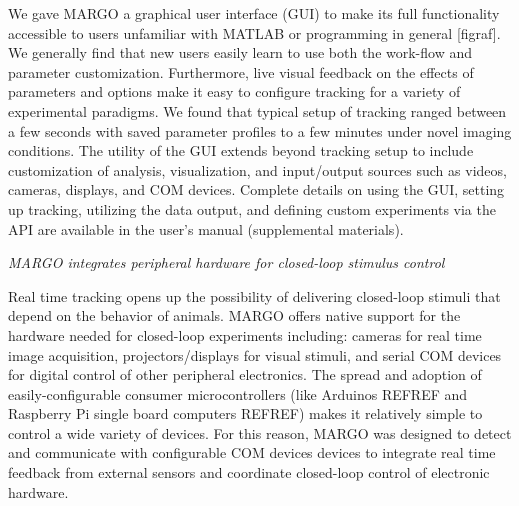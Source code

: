 \documentclass[10pt]{article}
\begin{document}
\begin{multicols}{2}
We gave MARGO a graphical user interface (GUI) to make its full functionality accessible to users unfamiliar with MATLAB or programming in general [figraf]. We generally find that new users easily learn to use both the work-flow and parameter customization. Furthermore, live visual feedback on the effects of parameters and options make it easy to configure tracking for a variety of experimental paradigms. We found that typical setup of tracking ranged between a few seconds with saved parameter profiles to a few minutes under novel imaging conditions. The utility of the GUI extends beyond tracking setup to include customization of analysis, visualization, and input/output sources such as videos, cameras, displays, and COM devices. Complete details on using the GUI, setting up tracking, utilizing the data output, and defining custom experiments via the API are available in the user's manual (supplemental materials).


\textit{MARGO integrates peripheral hardware for closed-loop stimulus control}

Real time tracking opens up the possibility of delivering closed-loop stimuli that depend on the behavior of animals. MARGO offers native support for the hardware needed for closed-loop experiments including: cameras for real time image acquisition, projectors/displays for visual stimuli, and serial COM devices for digital control of other peripheral electronics. The spread and adoption of easily-configurable consumer microcontrollers (like Arduinos REFREF and Raspberry Pi single board computers REFREF) makes it relatively simple to control a wide variety of devices. For this reason, MARGO was designed to detect and communicate with configurable COM devices devices to integrate real time feedback from external sensors and coordinate closed-loop control of electronic hardware. 


\end{multicols}
\end{document}
